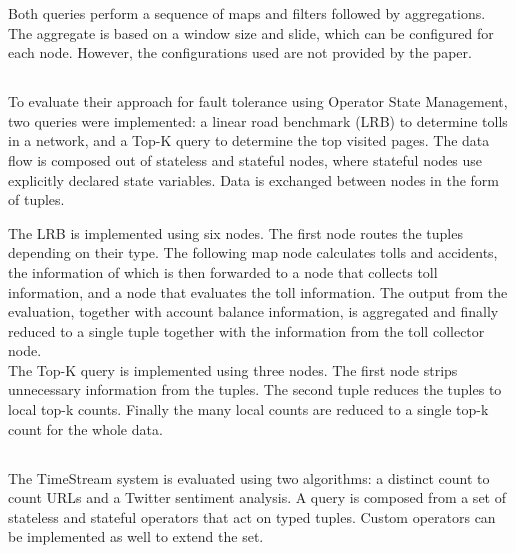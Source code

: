 
Both queries perform a sequence of maps and filters followed by aggregations. The aggregate is based on a window size and slide, which can be configured for each node. However, the configurations used are not provided by the paper.

\subsection{}
To evaluate their approach for fault tolerance using Operator State Management, two queries were implemented: a linear road benchmark (LRB) to determine tolls in a network, and a Top-K query to determine the top visited pages. The data flow is composed out of stateless and stateful nodes, where stateful nodes use explicitly declared state variables. Data is exchanged between nodes in the form of tuples. \\


The LRB is implemented using six nodes. The first node routes the tuples depending on their type. The following map node calculates tolls and accidents, the information of which is then forwarded to a node that collects toll information, and a node that evaluates the toll information. The output from the evaluation, together with account balance information, is aggregated and finally reduced to a single tuple together with the information from the toll collector node. \\

The Top-K query is implemented using three nodes. The first node strips unnecessary information from the tuples. The second tuple reduces the tuples to local top-k counts. Finally the many local counts are reduced to a single top-k count for the whole data.

\subsection{}
The TimeStream system is evaluated using two algorithms: a distinct count to count URLs and a Twitter sentiment analysis. A query is composed from a set of stateless and stateful operators that act on typed tuples. Custom operators can be implemented as well to extend the set. \\

